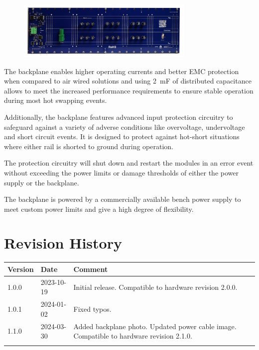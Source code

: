 \documentclass[10pt]{datasheet}
\begin{document}
\begin{figure}[ht]
    \centering
    \includegraphics[width=8.5cm]{images/backplane.jpg}
\end{figure}

The backplane enables higher operating currents and better EMC protection when compared to air wired solutions and using \qty{2}{\milli\farad} of distributed capacitance allows to meet the increased performance requirements to ensure stable operation during most hot swapping events.

Additionally, the backplane features advanced input protection circuitry to safeguard against a variety of adverse conditions like overvoltage, undervoltage and short circuit events. It is designed to protect against hot-short situations where either rail is shorted to ground during operation.

The protection circuitry will shut down and restart the modules in an error event without exceeding the power limits or damage thresholds of either the power supply or the backplane.

The backplane is powered by a commercially available bench power supply to meet custom power limits and give a high degree of flexibility.

\vfill\break

\onecolumn

\section{Revision History}
\begin{table}[h]
    \centering
    \begin{tabularx}{\textwidth}{l| l | >{\raggedright\arraybackslash}X}
        \thickhline
        Version& Date& Comment\\
        \hline
        1.0.0 &2023-10-19 & Initial release. Compatible to hardware revision 2.0.0.\\
        1.0.1 &2024-01-02 & Fixed typos.\\
        1.1.0 &2024-03-30 & Added backplane photo. Updated power cable image. Compatible to hardware revision 2.1.0.\\
        \thickhline
    \end{tabularx}
\end{table}
\end{document}
